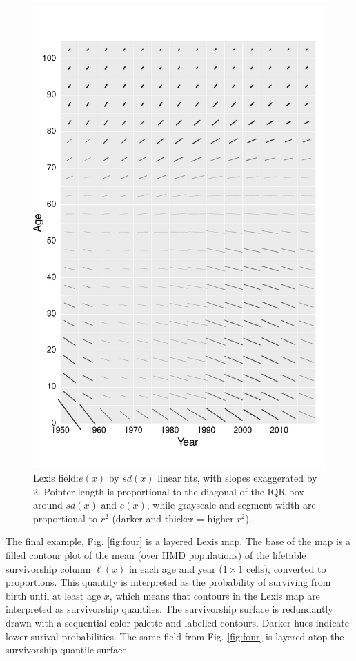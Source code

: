 \documentclass[10pt, twoside, parskip=half]{article}
\begin{document}
\begin{figure}[!t]

{\centering \includegraphics[width=0.8\linewidth]{Figures/FigApp2} 

}

\caption{Lexis field:\(e(x)\) by \(sd(x)\) linear fits, with slopes exaggerated by 2. Pointer length is proportional to the diagonal of the IQR box around \(sd(x)\) and \(e(x)\), while grayscale and segment width are proportional to \(r^2\) (darker and thicker = higher \(r^2\)).}\label{fig:three}
\end{figure}

The final example, Fig. \ref{fig:four} is a layered Lexis map. The base of the map is a filled contour plot of the mean (over HMD populations) of the lifetable survivorship column \(\ell(x)\) in each age and year (\(1 \times 1\) cells), converted to proportions. This quantity is interpreted as the probability of surviving from birth until at least age \(x\), which means that contours in the Lexis map are interpreted as survivorship quantiles. The survivorship surface is redundantly drawn with a sequential color palette and labelled contours. Darker hues indicate lower surival probabilities. The same field from Fig. \ref{fig:four} is layered atop the survivorship quantile surface.
\end{document}
